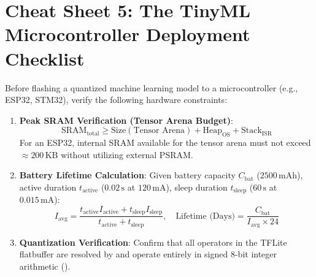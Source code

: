 \section{Cheat Sheet 5: The TinyML Microcontroller Deployment Checklist}\label{sec:cs_tinyml}

\begin{iotbox}
Before flashing a quantized machine learning model to a microcontroller (e.g., ESP32, STM32), verify the following hardware constraints:
\begin{enumerate}
    \item \textbf{Peak SRAM Verification (Tensor Arena Budget)}:
    \begin{equation}
    \text{SRAM}_{\text{total}} \ge \text{Size}(\text{Tensor Arena}) + \text{Heap}_{\text{OS}} + \text{Stack}_{\text{ISR}}
    \end{equation}
    For an ESP32, internal SRAM available for the tensor arena must not exceed $\approx 200\,\text{KB}$ without utilizing external PSRAM.
    \item \textbf{Battery Lifetime Calculation}:
    Given battery capacity $C_{\text{bat}}$ ($2500\,\text{mAh}$), active duration $t_{\text{active}}$ ($0.02\,\text{s}$ at $120\,\text{mA}$), sleep duration $t_{\text{sleep}}$ ($60\,\text{s}$ at $0.015\,\text{mA}$):
    \begin{equation}
    I_{\text{avg}} = \frac{t_{\text{active}} I_{\text{active}} + t_{\text{sleep}} I_{\text{sleep}}}{t_{\text{active}} + t_{\text{sleep}}}, \quad \text{Lifetime (Days)} = \frac{C_{\text{bat}}}{I_{\text{avg}} \times 24}
    \end{equation}
    \item \textbf{Quantization Verification}: Confirm that all operators in the TFLite flatbuffer are resolved by  and operate entirely in signed 8-bit integer arithmetic ().
\end{enumerate}
\end{iotbox}

